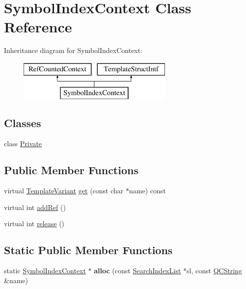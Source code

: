 \hypertarget{class_symbol_index_context}{}\section{Symbol\+Index\+Context Class Reference}
\label{class_symbol_index_context}
Inheritance diagram for Symbol\+Index\+Context\+:\begin{figure}[H]
\begin{center}
\leavevmode
\includegraphics[height=2.000000cm]{class_symbol_index_context}
\end{center}
\end{figure}
\subsection*{Classes}
\begin{DoxyCompactItemize}
\item 
class \mbox{\hyperlink{class_symbol_index_context_1_1_private}{Private}}
\end{DoxyCompactItemize}
\subsection*{Public Member Functions}
\begin{DoxyCompactItemize}
\item 
virtual \mbox{\hyperlink{class_template_variant}{Template\+Variant}} \mbox{\hyperlink{class_symbol_index_context_a14a6b834202fff93aabab305099f3a4a}{get}} (const char $\ast$name) const
\item 
virtual int \mbox{\hyperlink{class_symbol_index_context_a383ab05fb032a231f451d74db071c28e}{add\+Ref}} ()
\item 
virtual int \mbox{\hyperlink{class_symbol_index_context_a262d9c0254f388b048ecb240f8f00199}{release}} ()
\end{DoxyCompactItemize}
\subsection*{Static Public Member Functions}
\begin{DoxyCompactItemize}
\item 
\mbox{\label{class_symbol_index_context_a77faa24a2f821c6de1fdc5392e64cad0}} 
static \mbox{\hyperlink{class_symbol_index_context}{Symbol\+Index\+Context}} $\ast$ {\bfseries alloc} (const \mbox{\hyperlink{class_search_index_list}{Search\+Index\+List}} $\ast$sl, const \mbox{\hyperlink{class_q_c_string}{Q\+C\+String}} \&name)
\end{DoxyCompactItemize}


